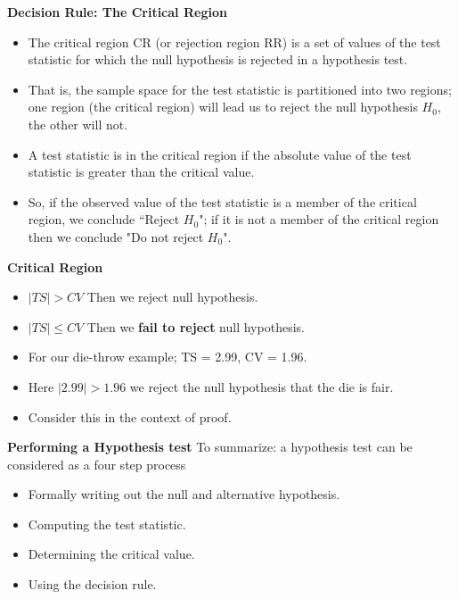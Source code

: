 

\noindent \textbf{Decision Rule:  The Critical Region}
\begin{itemize}
\item The critical region CR (or rejection region RR) is a set of values of the test statistic for which the null hypothesis is rejected in a hypothesis test. \item That is, the sample space for the test statistic is partitioned into two regions; one region (the critical region) will lead us to reject the null hypothesis $H_0$, the other will not.

\item A test statistic is in the critical region if the absolute value of the test statistic is greater than the critical value.
    \item So, if the observed value of the test statistic is a member of the critical region, we conclude ``Reject $H_0$"; if it is not a member of the critical region then we conclude "Do not reject $H_0$".
\end{itemize}




\noindent \textbf{Critical Region}
\begin{itemize}

\item $|TS| > CV$ Then we reject null hypothesis.
\item $|TS| \leq CV$ Then we \textbf{fail to reject} null hypothesis.

\item For our die-throw example; TS = 2.99, CV = 1.96.
\item Here $|2.99| > 1.96$ we reject the null hypothesis that the die is fair.
\item Consider this in the context of proof.
\end{itemize}




\noindent \textbf{Performing a Hypothesis test}
To summarize: a hypothesis test can be considered as a four step process
\begin{itemize}
\item Formally writing out the null and alternative hypothesis.
\item Computing the test statistic.
\item Determining the critical value.
\item Using the decision rule.
\end{itemize}




